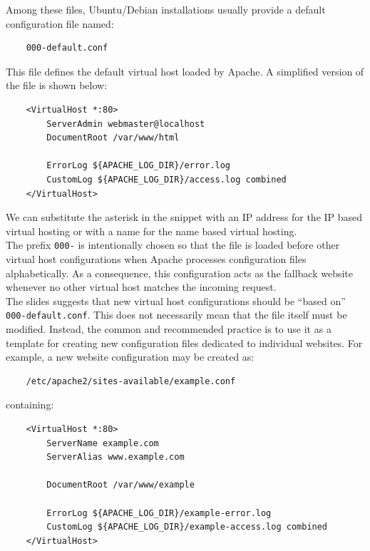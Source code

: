 \documentclass{scrbook}
\begin{document}
	Among these files, Ubuntu/Debian installations usually provide a default configuration file named:
	
	\begin{lstlisting}
	000-default.conf
	\end{lstlisting}
	
	This file defines the default virtual host loaded by Apache. A simplified version of the file is shown below:
	
	\begin{lstlisting}
	<VirtualHost *:80>
		ServerAdmin webmaster@localhost
		DocumentRoot /var/www/html
		
		ErrorLog ${APACHE_LOG_DIR}/error.log
		CustomLog ${APACHE_LOG_DIR}/access.log combined
	</VirtualHost>
	\end{lstlisting}
	
	We can substitute the asterisk in the snippet with an IP address for the IP based virtual hosting or with a name for the name based virtual hosting.\\
	
	The prefix \texttt{000-} is intentionally chosen so that the file is loaded before other virtual host configurations when Apache processes configuration files alphabetically. As a consequence, this configuration acts as the fallback website whenever no other virtual host matches the incoming request.\\
	
	The slides suggests that new virtual host configurations should be ``based on'' \texttt{000-default.conf}. This does not necessarily mean that the file itself must be modified. Instead, the common and recommended practice is to use it as a template for creating new configuration files dedicated to individual websites. For example, a new website configuration may be created as:
	
	\begin{lstlisting}
	/etc/apache2/sites-available/example.conf
	\end{lstlisting}
	
	containing:
	
	\begin{lstlisting}
	<VirtualHost *:80>
		ServerName example.com
		ServerAlias www.example.com
		
		DocumentRoot /var/www/example
		
		ErrorLog ${APACHE_LOG_DIR}/example-error.log
		CustomLog ${APACHE_LOG_DIR}/example-access.log combined
	</VirtualHost>
	\end{lstlisting}
	
\end{document}
